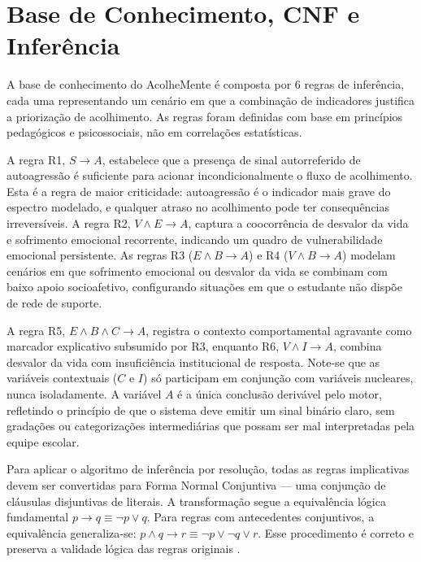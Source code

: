 \documentclass[
    12pt,
    openright,
    oneside,
    a4paper,
    english,
    brazil
]{abntex2}
\begin{document}


\chapter{Base de Conhecimento, CNF e Infer\^encia}

A base de conhecimento do AcolheMente \'e composta por 6 regras de infer\^encia, cada uma representando um cen\'ario em que a combina\c{c}\~ao de indicadores justifica a prioriza\c{c}\~ao de acolhimento. As regras foram definidas com base em princ\'ipios pedag\'ogicos e psicossociais, n\~ao em correla\c{c}\~oes estat\'isticas.

A regra R1, $S \rightarrow A$, estabelece que a presen\c{c}a de sinal autorreferido de autoagress\~ao \'e suficiente para acionar incondicionalmente o fluxo de acolhimento. Esta \'e a regra de maior criticidade: autoagress\~ao \'e o indicador mais grave do espectro modelado, e qualquer atraso no acolhimento pode ter consequ\^encias irrevers\'iveis. A regra R2, $V \land E \rightarrow A$, captura a coocorr\^encia de desvalor da vida e sofrimento emocional recorrente, indicando um quadro de vulnerabilidade emocional persistente. As regras R3 ($E \land B \rightarrow A$) e R4 ($V \land B \rightarrow A$) modelam cen\'arios em que sofrimento emocional ou desvalor da vida se combinam com baixo apoio socioafetivo, configurando situa\c{c}\~oes em que o estudante n\~ao disp\~oe de rede de suporte.

A regra R5, $E \land B \land C \rightarrow A$, registra o contexto comportamental agravante como marcador explicativo subsumido por R3, enquanto R6, $V \land I \rightarrow A$, combina desvalor da vida com insufici\^encia institucional de resposta. Note-se que as vari\'aveis contextuais ($C$ e $I$) s\'o participam em conjun\c{c}\~ao com vari\'aveis nucleares, nunca isoladamente. A vari\'avel $A$ \'e a \'unica conclus\~ao deriv\'avel pelo motor, refletindo o princ\'ipio de que o sistema deve emitir um sinal bin\'ario claro, sem grada\c{c}\~oes ou categoriza\c{c}\~oes intermedi\'arias que possam ser mal interpretadas pela equipe escolar.



Para aplicar o algoritmo de infer\^encia por resolu\c{c}\~ao, todas as regras implicativas devem ser convertidas para Forma Normal Conjuntiva --- uma conjun\c{c}\~ao de cl\'ausulas disjuntivas de literais. A transforma\c{c}\~ao segue a equival\^encia l\'ogica fundamental $p \rightarrow q \equiv \neg p \lor q$. Para regras com antecedentes conjuntivos, a equival\^encia generaliza-se: $p \land q \rightarrow r \equiv \neg p \lor \neg q \lor r$. Esse procedimento \'e correto e preserva a validade l\'ogica das regras originais \cite{russell_norvig_2022}.
\end{document}
